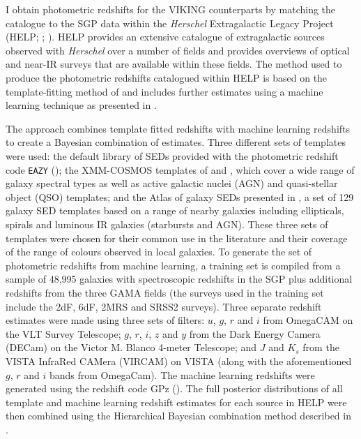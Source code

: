 I obtain photometric redshifts for the VIKING counterparts by matching the catalogue to the SGP data within the \textit{Herschel} Extragalactic Legacy Project (HELP; \citealt{Vaccari_2016}; \citealt{Shirley_2019}). HELP provides an extensive catalogue of extragalactic sources observed with \textit{Herschel} over a number of fields and provides overviews of optical and near-IR surveys that are available within these fields. The method used to produce the photometric redshifts catalogued within HELP is based on the template-fitting method of \citealt{Duncan_2018a} and includes further estimates using a machine learning technique as presented in \citealt{Duncan_2018b}.

The approach combines template fitted redshifts with machine learning redshifts to create a Bayesian combination of estimates. Three different sets of templates were used: the default library of SEDs provided with the photometric redshift code \texttt{EAZY} (\citealt{Brammer_2008}); the XMM-COSMOS templates of \citealt{Salvato_2009} and \citealt{Salvato_2011}, which cover a wide range of galaxy spectral types as well as active galactic nuclei (AGN) and quasi-stellar object (QSO) templates; and the Atlas of galaxy SEDs presented in \citealt{Brown_2014}, a set of 129 galaxy SED templates based on a range of nearby galaxies including ellipticals, spirals and luminous IR galaxies (starbursts and AGN). These three sets of templates were chosen for their common use in the literature and their coverage of the range of colours observed in local galaxies. To generate the set of photometric redshifts from machine learning, a training set is compiled from a sample of 48,995 galaxies with spectroscopic redshifts in the SGP plus additional redshifts from the three GAMA fields (the surveys used in the training set include the 2dF, 6dF, 2MRS and SRSS2 surveys). Three separate redshift estimates were made using three sets of filters: $u$, $g$, $r$ and $i$ from OmegaCAM on the VLT Survey Telescope; $g$, $r$, $i$, $z$ and $y$ from the Dark Energy Camera (DECam) on the Victor M. Blanco 4-meter Telescope; and $J$ and $K_s$ from the VISTA InfraRed CAMera (VIRCAM) on VISTA (along with the aforementioned $g$, $r$ and $i$ bands from OmegaCam). The machine learning redshifts were generated using the redshift code GPz (\citealt{Almosallam_2016}). The full posterior distributions of all template and machine learning redshift estimates for each source in HELP were then combined using the Hierarchical Bayesian combination method described in \citealt{Dahlen_2013}.

